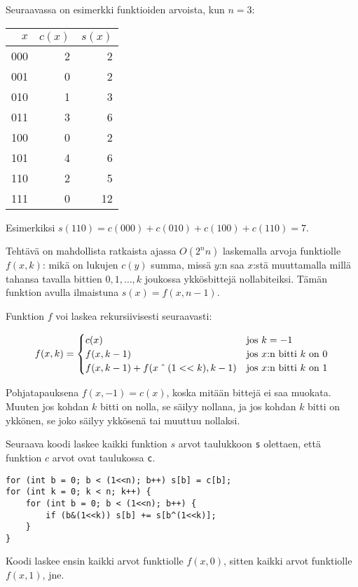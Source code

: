 \noindent
Seuraavassa on esimerkki funktioiden arvoista,
kun $n=3$:

\begin{center}
\begin{tabular}{rrr}
$x$ & $c(x)$ & $s(x)$ \\
\hline
000 & 2 & 2 \\
001 & 0 & 2 \\
010 & 1 & 3 \\
011 & 3 & 6 \\
100 & 0 & 2 \\
101 & 4 & 6 \\
110 & 2 & 5 \\
111 & 0 & 12 \\
\end{tabular}
\end{center}

Esimerkiksi $s(110)=c(000)+c(010)+c(100)+c(110)=7$. 

Tehtävä on mahdollista ratkaista ajassa $O(2^n n)$
laskemalla arvoja funktiolle $f(x,k)$:
mikä on lukujen $c(y)$ summa, missä $y$:n saa $x$:stä
muuttamalla millä tahansa tavalla bittien $0,1,\ldots,k$
joukossa ykkösbittejä nollabiteiksi.
Tämän funktion avulla ilmaistuna $s(x)=f(x,n-1)$.

Funktion $f$ voi laskea rekursiivisesti seuraavasti:

\begin{equation*}
    f(x,k) = \begin{cases}
               c(x)          & \textrm{jos $k=-1$}\\
               f(x,k-1)          & \textrm{jos $x$:n bitti $k$ on 0}\\
               f(x,k-1)+f(x \XOR (1 < < k),k-1)    & \textrm{jos $x$:n bitti $k$ on 1}\\
           \end{cases}
\end{equation*}

Pohjatapauksena $f(x,-1)=c(x)$,
koska mitään bittejä ei saa muokata.
Muuten jos kohdan $k$ bitti on nolla,
se säilyy nollana, ja jos kohdan $k$ bitti on ykkönen,
se joko säilyy ykkösenä tai muuttuu nollaksi.

Seuraava koodi laskee kaikki funktion $s$ arvot taulukkoon
\texttt{s} olettaen, että funktion $c$ arvot ovat
taulukossa \texttt{c}.
\begin{lstlisting}
for (int b = 0; b < (1<<n); b++) s[b] = c[b];
for (int k = 0; k < n; k++) {
    for (int b = 0; b < (1<<n); b++) {
        if (b&(1<<k)) s[b] += s[b^(1<<k)];
    }
}
\end{lstlisting}
Koodi laskee ensin kaikki arvot funktiolle $f(x,0)$,
sitten kaikki arvot funktiolle $f(x,1)$, jne.